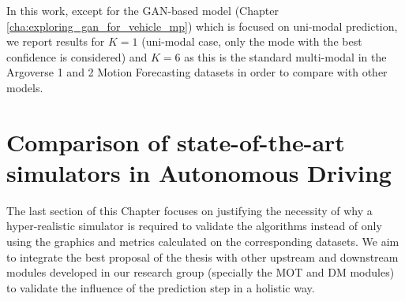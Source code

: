 In this work, except for the GAN-based model (Chapter \ref{cha:exploring_gan_for_vehicle_mp}) which is focused on uni-modal prediction, we report results for $K=1$ (uni-modal case, only the mode with the best confidence is considered) and $K=6$ as this is the standard multi-modal in the Argoverse 1 and 2 Motion Forecasting datasets in order to compare with other models.

\section{Comparison of state-of-the-art simulators in Autonomous Driving}
\label{sec:2_sota_simulators_ad}

The last section of this Chapter focuses on justifying the necessity of why a hyper-realistic simulator is required to validate the algorithms instead of only using the graphics and metrics calculated on the corresponding datasets. We aim to integrate the best proposal of the thesis with other upstream and downstream modules developed in our research group (specially the \ac{MOT} and \ac{DM} modules) to validate the influence of the prediction step in a holistic way.



